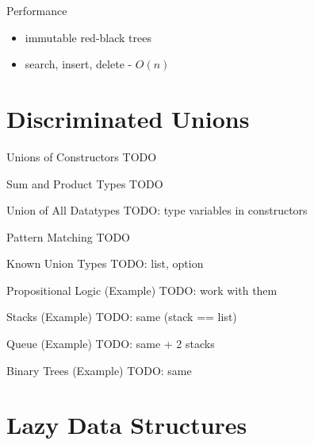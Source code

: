 \documentclass{beamer}
\begin{document}
\begin{frame}{Performance}
  \begin{itemize}[<+->]
    \item immutable red-black trees
    \item search, insert, delete - $O(n)$
  \end{itemize}
\end{frame}

\section{Discriminated Unions}
\frame{\tableofcontents[currentsection]}


\begin{frame}{Unions of Constructors}
  TODO
\end{frame}

\begin{frame}{Sum and Product Types}
  TODO
\end{frame}

\begin{frame}{Union of All Datatypes}
  TODO: type variables in constructors
\end{frame}

\begin{frame}{Pattern Matching}
  TODO
\end{frame}

\begin{frame}{Known Union Types}
  TODO: list, option
\end{frame}

\begin{frame}{Propositional Logic (Example)}
  TODO: work with them
\end{frame}

\begin{frame}{Stacks (Example)}
  TODO: same (stack == list)
\end{frame}

\begin{frame}{Queue (Example)}
  TODO: same + 2 stacks
\end{frame}

\begin{frame}{Binary Trees (Example)}
  TODO: same
\end{frame}

\section{Lazy Data Structures}
\frame{\tableofcontents[currentsection]}
\end{document}
